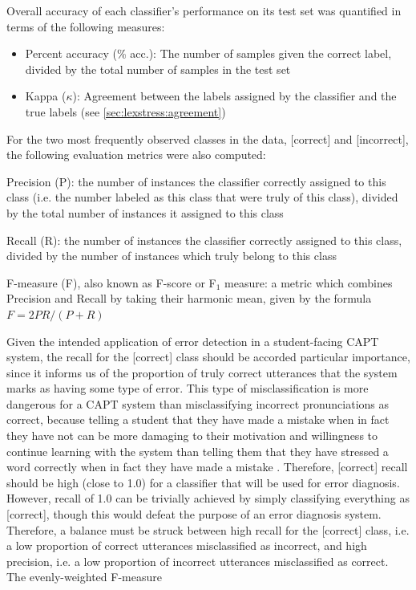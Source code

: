 	Overall accuracy of each classifier's performance on its test set was quantified in terms of the following measures:
		\begin{itemize}
		\item{Percent accuracy (\% acc.): The number of samples given the correct label, divided by the total number of samples in the test set}
		\item{Kappa ($\kappa$): Agreement between the labels assigned by the classifier and the true labels 
		(see \cref{sec:lexstress:agreement})}
		\end{itemize}
For the two most frequently observed classes in the data, [correct] and [incorrect], the following evaluation metrics were also computed:
			\begin{itemize}
			\item{Precision (P): the number of instances the classifier correctly assigned to this class (i.e. the number labeled as this class that were truly of this class), divided by the total number of instances it assigned to this class}
			\item{Recall (R): the number of instances the classifier correctly assigned to this class, divided by the number of instances which truly belong to this class}
			\item{F-measure (F), also known as F-score or F$_1$ measure: a metric which combines Precision and Recall by taking their harmonic mean, given by the formula $F = 2PR/(P+R)$ 
			\item{}
			}
			\end{itemize}
	Given the intended application of error detection in a student-facing CAPT system, the recall for the [correct] class should be accorded particular importance, since it informs us of the proportion of truly correct utterances that the system marks as having some type of error. This type of misclassification is more dangerous for a CAPT system than misclassifying incorrect pronunciations as correct, because telling a student that they have made a mistake when in fact they have not can be more damaging to their motivation and willingness to continue learning with the system than telling them that they have stressed a word correctly when in fact they have made a mistake . Therefore, [correct] recall should be high (close to 1.0) for a classifier that will be used for error diagnosis. However, recall of 1.0 can be trivially achieved by simply classifying everything as [correct], though this would defeat the purpose of an error diagnosis system. Therefore, a balance must be struck between high recall  for the [correct] class, i.e. a low proportion of correct utterances misclassified as incorrect, and high precision, i.e. a low proportion of incorrect utterances misclassified as correct. The evenly-weighted F-measure 
	
